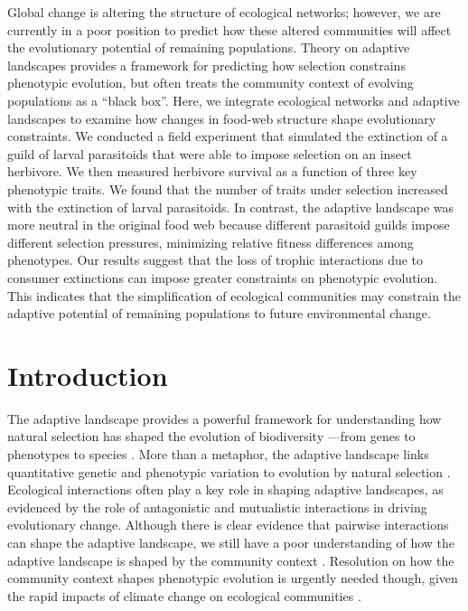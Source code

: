 \documentclass[11pt,]{article}
\begin{document}
Global change is altering the structure of ecological networks; however,
we are currently in a poor position to predict how these altered
communities will affect the evolutionary potential of remaining
populations. Theory on adaptive landscapes provides a framework for
predicting how selection constrains phenotypic evolution, but often
treats the community context of evolving populations as a ``black box''.
Here, we integrate ecological networks and adaptive landscapes to
examine how changes in food-web structure shape evolutionary
constraints. We conducted a field experiment that simulated the
extinction of a guild of larval parasitoids that were able to impose
selection on an insect herbivore. We then measured herbivore survival as
a function of three key phenotypic traits. We found that the number of
traits under selection increased with the extinction of larval
parasitoids. In contrast, the adaptive landscape was more neutral in the
original food web because different parasitoid guilds impose different
selection pressures, minimizing relative fitness differences among
phenotypes. Our results suggest that the loss of trophic interactions
due to consumer extinctions can impose greater constraints on phenotypic
evolution. This indicates that the simplification of ecological
communities may constrain the adaptive potential of remaining
populations to future environmental change.

\newpage

\section{Introduction}\label{introduction}

The adaptive landscape provides a powerful framework for understanding
how natural selection has shaped the evolution of biodiversity ---from
genes to phenotypes to species
\citep{Wright1931, Simpson1944, Arnold2001}. More than a metaphor, the
adaptive landscape links quantitative genetic and phenotypic variation
to evolution by natural selection
\citep{Lande1979, Arnold1984applications, Arnold1984theory}. Ecological
interactions often play a key role in shaping adaptive landscapes, as
evidenced by the role of antagonistic \citep{Schluter2000, Abrams2000}
and mutualistic \citep{Bronstein2006} interactions in driving
evolutionary change. Although there is clear evidence that pairwise
interactions can shape the adaptive landscape, we still have a poor
understanding of how the adaptive landscape is shaped by the community
context \citep{McPeek2017, terHorst2018}. Resolution on how the
community context shapes phenotypic evolution is urgently needed though,
given the rapid impacts of climate change on ecological communities
\citep{Scheffers2016}.
\end{document}
